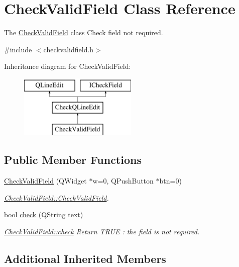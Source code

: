 \hypertarget{classCheckValidField}{\section{Check\-Valid\-Field Class Reference}
\label{classCheckValidField}
}


The \hyperlink{classCheckValidField}{Check\-Valid\-Field} class Check field not required.  




{\ttfamily \#include $<$checkvalidfield.\-h$>$}

Inheritance diagram for Check\-Valid\-Field\-:\begin{figure}[H]
\begin{center}
\leavevmode
\includegraphics[height=3.000000cm]{dc/d93/classCheckValidField}
\end{center}
\end{figure}
\subsection*{Public Member Functions}
\begin{DoxyCompactItemize}
\item 
\hyperlink{classCheckValidField_acfb0bb44b22b5355a227273f439210b8}{Check\-Valid\-Field} (Q\-Widget $\ast$w=0, Q\-Push\-Button $\ast$btn=0)
\begin{DoxyCompactList}\small\item\em \hyperlink{classCheckValidField_acfb0bb44b22b5355a227273f439210b8}{Check\-Valid\-Field\-::\-Check\-Valid\-Field}. \end{DoxyCompactList}\item 
bool \hyperlink{classCheckValidField_a192b1c9c84ea8897661425fd3c0b9e8e}{check} (Q\-String text)
\begin{DoxyCompactList}\small\item\em \hyperlink{classCheckValidField_a192b1c9c84ea8897661425fd3c0b9e8e}{Check\-Valid\-Field\-::check} Return T\-R\-U\-E \-: the field is not required. \end{DoxyCompactList}\end{DoxyCompactItemize}
\subsection*{Additional Inherited Members}


